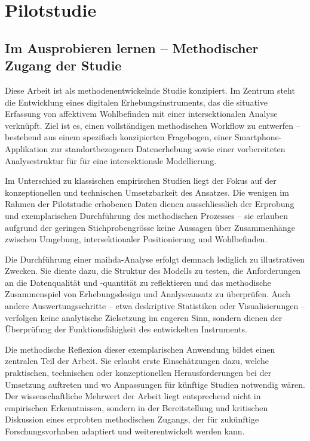 \section{Pilotstudie}
\label{sec:pilotstudie}

\subsection{Im Ausprobieren lernen – Methodischer Zugang der Studie} \label{sec:methodenentwickelnd}

Diese Arbeit ist als methodenentwickelnde Studie konzipiert. Im Zentrum steht die Entwicklung eines digitalen Erhebungsinstruments, das die situative Erfassung von affektivem Wohlbefinden mit einer intersektionalen Analyse verknüpft. Ziel ist es, einen vollständigen methodischen Workflow zu entwerfen – bestehend aus einem spezifisch konzipierten Fragebogen, einer Smartphone-Applikation zur standortbezogenen Datenerhebung sowie einer vorbereiteten Analysestruktur für für eine intersektionale Modellierung.

Im Unterschied zu klassischen empirischen Studien liegt der Fokus auf der konzeptionellen und technischen Umsetzbarkeit des Ansatzes. Die wenigen im Rahmen der Pilotstudie erhobenen Daten dienen ausschliesslich der Erprobung und exemplarischen Durchführung des methodischen Prozesses – sie erlauben aufgrund der geringen Stichprobengrösse keine  Aussagen über Zusammenhänge zwischen Umgebung, intersektionaler Positionierung und Wohlbefinden.

Die Durchführung einer \acrshort{maihda}-Analyse erfolgt demnach lediglich zu illustrativen Zwecken. Sie diente dazu, die Struktur des Modells zu testen, die Anforderungen an die Datenqualität und -quantität zu reflektieren und das methodische Zusammenspiel von Erhebungsdesign und Analyseansatz zu überprüfen. Auch andere Auswertungsschritte – etwa deskriptive Statistiken oder Visualisierungen – verfolgen keine analytische Zielsetzung im engeren Sinn, sondern dienen der Überprüfung der Funktionsfähigkeit des entwickelten Instruments.

Die methodische Reflexion dieser exemplarischen Anwendung bildet einen zentralen Teil der Arbeit. Sie erlaubt erste Einschätzungen dazu, welche praktischen, technischen oder konzeptionellen Herausforderungen bei der Umsetzung auftreten und wo Anpassungen für künftige Studien notwendig wären. Der wissenschaftliche Mehrwert der Arbeit liegt entsprechend nicht in empirischen Erkenntnissen, sondern in der Bereitstellung und kritischen Diskussion eines erprobten methodischen Zugangs, der für zukünftige Forschungsvorhaben adaptiert und weiterentwickelt werden kann.

